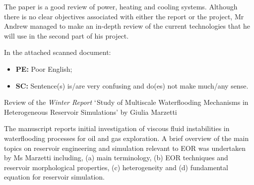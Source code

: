 \documentclass[14pt,twoside]{report}
\begin{document}
The paper is a good review of power, heating and cooling systems. Although there is no clear objectives associated with either the report or the project, Mr Andrew managed to make an in-depth review of the current technologies that he will use in the second part of his project.


In the attached scanned document:
\begin{itemize}
\item {\bf PE:} Poor English;
\item {\bf SC:} Sentence(s) is/are very confusing and do(es) not make much/any sense.   
\end{itemize}
\medskip




\clearpage


\bigskip

\begin{center}
  {\Large Review of the {\it Winter Report} $\lq$Study of Multiscale Waterflooding Mechanisms in Heterogeneous Reservoir Simulations' by Giulia Marzetti}
\end{center}

The manuscript reports initial investigation of viscous fluid instabilities in waterflooding processes for oil and gas exploration.  A brief overview of the main topics on reservoir engineering and simulation relevant to EOR was undertaken by Ms Marzetti including, (a) main terminology, (b) EOR techniques and reservoir morphological properties, (c) heterogeneity and (d) fundamental equation for reservoir simulation.  
\end{document}
